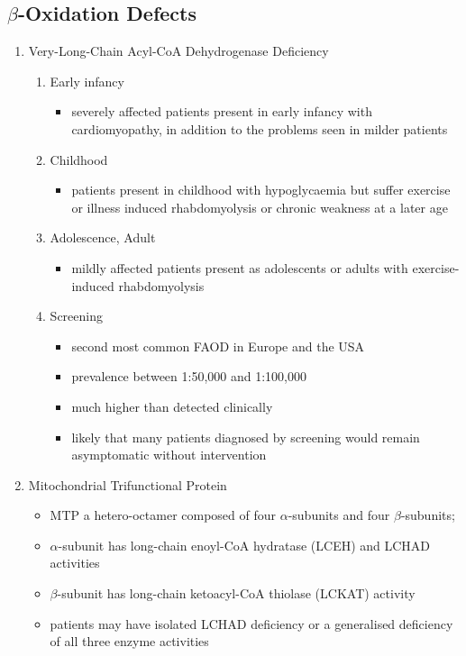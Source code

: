 \documentclass{scrartcl}
\begin{document}
\subsection{\(\beta\)-Oxidation Defects}
\label{sec:org876a5c2}
\begin{enumerate}
\item Very-Long-Chain Acyl-CoA Dehydrogenase Deficiency
\label{sec:orgfe5d129}
\begin{enumerate}
\item Early infancy
\label{sec:org7ba7a58}
\begin{itemize}
\item severely affected patients present in early infancy with
cardiomyopathy, in addition to the problems seen in milder patients
\end{itemize}

\item Childhood
\label{sec:orgc25c2da}
\begin{itemize}
\item patients present in childhood with hypoglycaemia but suffer exercise
or illness induced rhabdomyolysis or chronic weakness at a later age
\end{itemize}

\item Adolescence, Adult
\label{sec:org29d7829}
\begin{itemize}
\item mildly affected patients present as adolescents or adults with
exercise-induced rhabdomyolysis
\end{itemize}

\item Screening
\label{sec:org220c8c0}
\begin{itemize}
\item second most common FAOD in Europe and the USA
\item prevalence between 1:50,000 and 1:100,000
\item much higher than detected clinically
\item likely that many patients diagnosed by screening would remain
asymptomatic without intervention
\end{itemize}
\end{enumerate}

\item Mitochondrial Trifunctional Protein
\label{sec:org4556bbc}
\begin{itemize}
\item MTP a hetero-octamer composed of four \(\alpha\)-subunits and four \(\beta\)-subunits;
\item \(\alpha\)-subunit has long-chain enoyl-CoA hydratase (LCEH) and LCHAD activities
\item \(\beta\)-subunit has long-chain ketoacyl-CoA thiolase (LCKAT) activity
\item patients may have isolated LCHAD deficiency or a generalised deficiency of all three enzyme activities


\end{itemize}
\end{enumerate}
\end{document}
